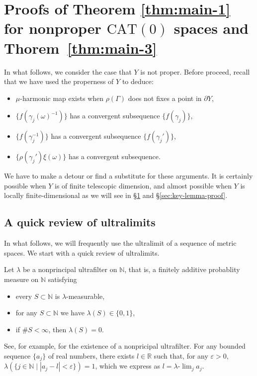 \documentclass[12pt]{amsart}
\numberwithin{equation}{section}
\theoremstyle{plain}
\theoremstyle{definition}
\theoremstyle{remark}
\newcommand{\R}{{\mathbb R}}
\newcommand{\N}{{\mathbb N}}
\newcommand{\cat}[1]{\mathrm{CAT}(#1)}
\newcommand{\ulim}{\lambda{\text{-}}\!\lim}
\begin{document}
\section{Proofs of 
Theorem \ref{thm:main-1} for nonproper $\cat{0}$
spaces and Thorem~\ref{thm:main-3}}
\label{sec:when-y-not}

In what follows, we consider the case that $Y$ is not proper. 
Before proceed, recall that we have used the properness of $Y$ to 
deduce:
\begin{itemize}
 \item $\mu$-harmonic map exists when $\rho(\Gamma)$ does not fixes a
       point in $\partial Y$, 
 \item $\{f(\gamma_j(\omega)^{-1})\}$ has a convergent subsequence 
       $\{f(\gamma_j)\}$, 
 \item $\{f(\gamma_j^{-1})\}$ has a convergent subsequence
       $\{f(\gamma_j')\}$, 
 \item $\{\rho(\gamma_j')\xi(\omega)\}$ has a convergent subsequence. 
\end{itemize}
We have to make a detour or find a substitute for these arguments. 
It is certainly possible when $Y$ is of finite telescopic dimension, and
almost possible when $Y$ is locally finite-dimensional as we will see in
\S \ref{sec:when-y-not} and \S \ref{sec:key-lemma-proof}.  

\subsection{A quick review of ultralimits}
\label{sec:quick-revi-ultr}
In what follows, we will frequently use the ultralimit of a sequence of
metric spaces. We start with a quick review of ultralimits.

%
%
Let $\lambda$ be a nonprincipal ultrafilter on $\N$, that is, a finitely
additive probablity measure on $\N$ satisfying
\begin{itemize}
 \item every $S \subset \N$ is $\lambda$-measurable, 
 \item for any $S \subset \N$ we have $\lambda (S)\in \{0,1\}$, 
 \item if $\# S <\infty$, then $\lambda (S)=0$. 
\end{itemize}
 See, for example, \cite[5.48 Exercise]{bridson-haefliger} for the
 existence of a nonpricipal ultrafilter. 
 For any bounded sequence $\{a_j\}$ of real numbers, there exists 
 $l \in \R$ such that, for any $\varepsilon>0$, 
 $\lambda (\{j \in \N \mid |a_j-l|<\varepsilon\})=1$, which we express
 as $l=\ulim_j a_j$. 
\end{document}

